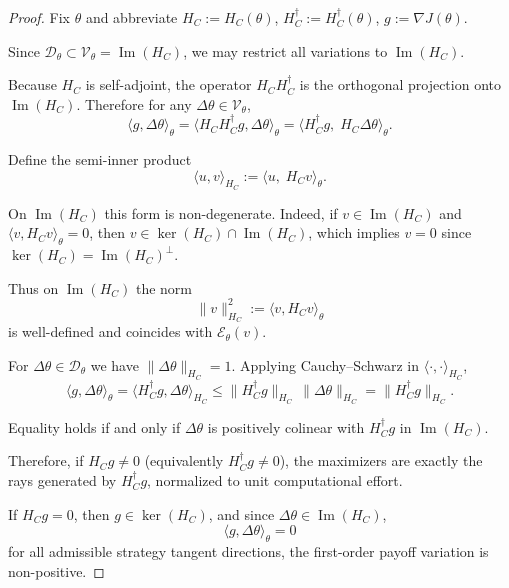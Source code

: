 \documentclass[11pt,a4paper,twocolumn]{article}
\begin{document}
 \begin{proof}
  Fix $\theta$ and abbreviate
  $H_C := H_C(\theta)$,
  $H_C^\dagger := H_C^\dagger(\theta)$,
  $g := \nabla J(\theta)$.
  
  Since $\mathcal{D}_\theta \subset \mathcal{V}_\theta = \operatorname{Im}(H_C)$,
  we may restrict all variations to $\operatorname{Im}(H_C)$.
  
  Because $H_C$ is self-adjoint,
  the operator $H_C H_C^\dagger$ is the orthogonal projection onto $\operatorname{Im}(H_C)$.
  Therefore for any $\Delta\theta\in\mathcal{V}_\theta$,
  \begin{equation}
   \langle g,\Delta\theta\rangle_\theta
   =
   \langle H_C H_C^\dagger g,\Delta\theta\rangle_\theta
   =
   \langle H_C^\dagger g,\; H_C \Delta\theta\rangle_\theta.
  \end{equation}
  
  Define the semi-inner product
  \[
  \langle u,v\rangle_{H_C}
  :=
  \langle u,\; H_C v\rangle_\theta.
  \]
  
  On $\operatorname{Im}(H_C)$ this form is non-degenerate.
  Indeed, if $v\in\operatorname{Im}(H_C)$ and
  $\langle v,H_C v\rangle_\theta=0$,
  then $v\in\ker(H_C)\cap\operatorname{Im}(H_C)$,
  which implies $v=0$ since
  $\ker(H_C)=\operatorname{Im}(H_C)^\perp$.
  
  Thus on $\operatorname{Im}(H_C)$ the norm
  \[
  \|v\|_{H_C}^2 := \langle v,H_C v\rangle_\theta
  \]
  is well-defined and coincides with $\mathcal{E}_\theta(v)$.
  
  For $\Delta\theta\in\mathcal{D}_\theta$ we have $\|\Delta\theta\|_{H_C}=1$.
  Applying Cauchy--Schwarz in $\langle\cdot,\cdot\rangle_{H_C}$,
  \[
  \langle g,\Delta\theta\rangle_\theta
  =
  \langle H_C^\dagger g,\Delta\theta\rangle_{H_C}
  \le
  \|H_C^\dagger g\|_{H_C}\,\|\Delta\theta\|_{H_C}
  =
  \|H_C^\dagger g\|_{H_C}.
  \]
  
  Equality holds if and only if $\Delta\theta$
  is positively colinear with $H_C^\dagger g$
  in $\operatorname{Im}(H_C)$.
  
  Therefore, if $H_C g\neq 0$
  (equivalently $H_C^\dagger g\neq 0$),
  the maximizers are exactly the rays generated by $H_C^\dagger g$,
  normalized to unit computational effort.
  
  If $H_C g = 0$,
  then $g\in\ker(H_C)$,
  and since $\Delta\theta\in\operatorname{Im}(H_C)$,
  \[
  \langle g,\Delta\theta\rangle_\theta = 0
  \]
  for all admissible strategy tangent directions,
  the first-order payoff variation is non-positive.
 \end{proof}
 
\end{document}

